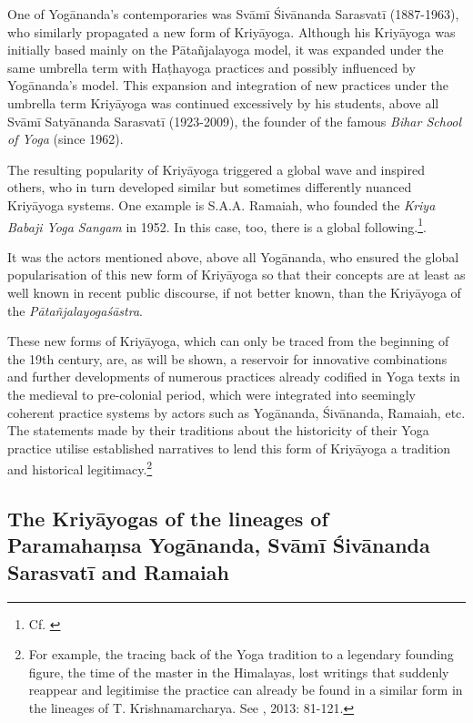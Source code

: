 One of Yogānanda's contemporaries was Svāmī Śivānanda Sarasvatī (1887-1963), who similarly propagated a new form of Kriyāyoga. Although his Kriyāyoga was initially based mainly on the Pātañjalayoga model, it was expanded under the same umbrella term with Haṭhayoga practices and possibly influenced by Yogānanda's model. This expansion and integration of new practices under the umbrella term Kriyāyoga was continued excessively by his students, above all Svāmī Satyānanda Sarasvatī (1923-2009), the founder of the famous \textit{Bihar School of Yoga} (since 1962).

The resulting popularity of Kriyāyoga triggered a global wave and inspired others, who in turn developed similar but sometimes differently nuanced Kriyāyoga systems. One example is S.A.A. Ramaiah, who founded the \textit{Kriya Babaji Yoga Sangam} in 1952. In this case, too, there is a global following.\footnote{Cf. \cite{kriyababajiyoga}}.

It was the actors mentioned above, above all Yogānanda, who ensured the global popularisation of this new form of Kriyāyoga so that their concepts are at least as well known in recent public discourse, if not better known, than the Kriyāyoga of the \textit{Pātañjalayogaśāstra}.

These new forms of Kriyāyoga, which can only be traced from the beginning of the 19th century, are, as will be shown, a reservoir for innovative combinations and further developments of numerous practices already codified in Yoga texts in the medieval to pre-colonial period, which were integrated into seemingly coherent practice systems by actors such as Yogānanda, Śivānanda, Ramaiah, etc. The statements made by their traditions about the historicity of their Yoga practice utilise established narratives to lend this form of Kriyāyoga a tradition and historical legitimacy.\footnote{For example, the tracing back of the Yoga tradition to a legendary founding figure, the time of the master in the Himalayas, lost writings that suddenly reappear and legitimise the practice can already be found in a similar form in the lineages of T. Krishnamarcharya. See \citeauthor{singleton2013gurus}, 2013: 81-121.}


\subsection{The Kriyāyogas of the lineages of Paramahaṃsa Yogānanda, Svāmī Śivānanda Sarasvatī and Ramaiah}

